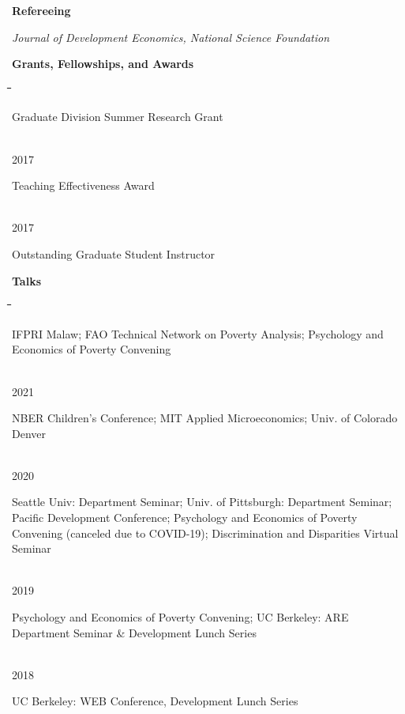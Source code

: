 \documentclass[10pt, oneside]{article}
\makeatletter
\newlength\tdima
\newcommand\tabfill[1]{%
      \setlength\tdima{\linewidth}%
      \addtolength\tdima{\@totalleftmargin}%
      \addtolength\tdima{-\dimen\@curtab}%
      \parbox[t]{\tdima}{#1\ifhmode\strut\fi}}
\newcommand\mytabs{\hspace*{1cm}\=\hspace{1cm}\=\hspace{1cm}\=\hspace{1cm}\=\hspace{1cm}\=\hspace{1cm}\=\hspace{1cm}\=\hspace{1cm}\=\hspace{1cm}\=\hspace{1cm}}
\newenvironment{mysec}[1][\mytabs]
  {\begin{tabbing}#1\kill\ignorespaces}
  {\end{tabbing}}
\makeatother
\begin{document}
\begin{minipage}[t]{0.1\linewidth}
\textbf{Refereeing}
\end{minipage}\hspace{0.05\linewidth}
\begin{minipage}[t]{0.8\linewidth}
 \emph{Journal of Development Economics, National Science Foundation}
\end{minipage}\vspace{5mm}



\begin{minipage}[t]{0.1\linewidth}
\textbf{Grants, Fellowships, and Awards}
\end{minipage}\hspace{0.05\linewidth}
\begin{minipage}[t]{0.8\linewidth}
\begin{mysec} 
	2018 \>\>\tabfill{Graduate Division Summer Research Grant} \\
	2017 \>\>\tabfill{Teaching Effectiveness Award}\\
	2017 \>\>\tabfill{Outstanding Graduate Student Instructor}
\end{mysec} 
\end{minipage}\vspace{5mm}


\begin{minipage}[t]{0.1\linewidth}
\textbf{Talks}
\end{minipage}\hspace{0.05\linewidth}
\begin{minipage}[t]{0.8\linewidth}
\begin{mysec} 
	2022\>\> \tabfill{ IFPRI Malaw; FAO Technical Network on Poverty Analysis; Psychology and Economics of Poverty Convening} \\
	2021\>\> \tabfill{ NBER Children's Conference; MIT Applied Microeconomics; Univ. of Colorado Denver} \\
	2020\>\> \tabfill{Seattle Univ: Department Seminar; Univ. of Pittsburgh: Department Seminar; Pacific  Development Conference; Psychology and Economics of Poverty Convening (canceled due to COVID-19); Discrimination and Disparities Virtual Seminar } \\
	2019\>\> \tabfill{Psychology and Economics of Poverty Convening; UC Berkeley: ARE Department Seminar \& Development Lunch Series} \\
	2018\>\> \tabfill{UC Berkeley: WEB Conference,  Development Lunch Series} \\
\end{mysec} 
\end{minipage}\vspace{4mm}
\end{document}
